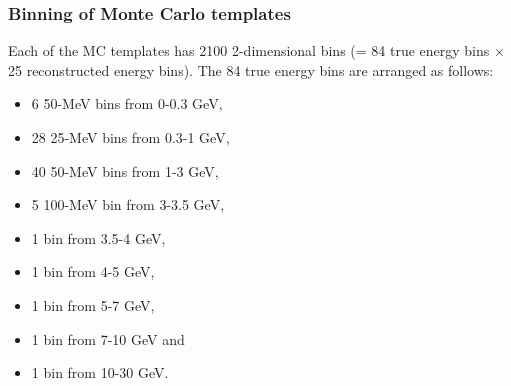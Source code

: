 \begin{itemize}
\end{itemize}



%
%




\subsubsection {Binning of Monte Carlo templates}
\label{sec:mc_templates:template_binning}

Each of the \NMCTemplate{}  MC templates has 2100 2-dimensional bins (= 84 true energy bins $\times$ 25 reconstructed energy bins).
The 84 true energy bins are arranged as follows:
\begin{itemize}
 \item   6 50-MeV bins from 0-0.3 GeV, 
 \item   28 25-MeV bins from 0.3-1 GeV, 
 \item   40 50-MeV bins from 1-3 GeV, 
 \item   5 100-MeV bin from 3-3.5 GeV, 
 \item   1 bin from 3.5-4 GeV, 
 \item   1 bin from 4-5 GeV, 
 \item   1 bin from 5-7 GeV, 
 \item   1 bin from 7-10 GeV and
 \item   1 bin from 10-30 GeV.
\end{itemize}

